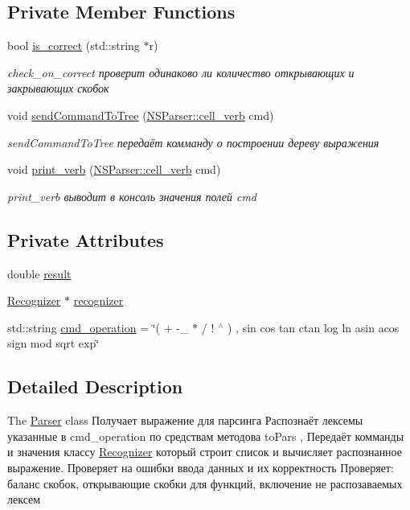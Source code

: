 \subsection*{Private Member Functions}
\begin{DoxyCompactItemize}
\item 
bool \hyperlink{classParser_a2debdde495ea6985cdb52cbe026d7a22}{is\+\_\+correct} (std\+::string $\ast$r)
\begin{DoxyCompactList}\small\item\em check\+\_\+on\+\_\+correct проверит одинаково ли количество открывающих и закрывающих скобок \end{DoxyCompactList}\item 
void \hyperlink{classParser_ac61a1fedefe50ed900f0e65c029053c1}{send\+Command\+To\+Tree} (\hyperlink{structNSParser_1_1cell__verb}{N\+S\+Parser\+::cell\+\_\+verb} cmd)
\begin{DoxyCompactList}\small\item\em send\+Command\+To\+Tree передаёт комманду о построении дереву выражения \end{DoxyCompactList}\item 
void \hyperlink{classParser_a0caed183ad698e5fac90819091140e0a}{print\+\_\+verb} (\hyperlink{structNSParser_1_1cell__verb}{N\+S\+Parser\+::cell\+\_\+verb} cmd)
\begin{DoxyCompactList}\small\item\em print\+\_\+verb выводит в консоль значения полей cmd \end{DoxyCompactList}\end{DoxyCompactItemize}
\subsection*{Private Attributes}
\begin{DoxyCompactItemize}
\item 
double \hyperlink{classParser_adab1eb7202f5042fa2daa7cd4238799e}{result}
\item 
\hyperlink{classRecognizer}{Recognizer} $\ast$ \hyperlink{classParser_a095ffde82968c2b8b067752f1b7ff9f5}{recognizer}
\item 
std\+::string \hyperlink{classParser_aab0019b329a95aca59b17250045ca808}{cmd\+\_\+operation} = \char`\"{}( + -\/\+\_\+ $\ast$ / ! $^\wedge$ ) , sin cos tan ctan log ln asin acos sign mod sqrt exp\char`\"{}
\end{DoxyCompactItemize}


\subsection{Detailed Description}
The \hyperlink{classParser}{Parser} class Получает выражение для парсинга Распознаёт лексемы указанные в cmd\+\_\+operation по средствам методова to\+Pars , Передаёт комманды и значения классу \hyperlink{classRecognizer}{Recognizer} который строит список и вычисляет распознанное выражение. Проверяет на ошибки ввода данных и их корректность Проверяет\+: баланс скобок, открывающие скобки для функций, включение не распозаваемых лексем 

